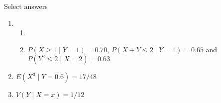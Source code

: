 \documentclass{article}
\begin{document}
\vspace{20pt}
    
Select answers\bigskip
\begin{enumerate}
    \item 
    \begin{enumerate}
        \item 
        \item $P(X \ge 1 \mid Y = 1) = 0.70$, $P(X + Y \le 2 \mid Y = 1) = 0.65$ and $P(Y^2 \le 2 \mid X = 2) = 0.63$
    \end{enumerate}
    
    \item $E(X^3 \mid Y = 0.6) = 17/48$
    
    \item $V(Y \mid X = x) = 1/12$
        
\end{enumerate}
\end{document}
